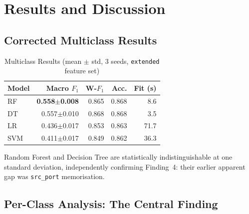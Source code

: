 \documentclass[conference]{IEEEtran}
\newcommand{\col}[1]{\texttt{\small #1}}
\begin{document}
\section{Results and Discussion}
\label{sec:results}

\subsection{Corrected Multiclass Results}

\begin{table}[htbp]
\caption{Multiclass Results (mean $\pm$ std, 3 seeds, \texttt{extended} feature set)}
\centering
\begin{tabular}{lrrrr}
\toprule
\textbf{Model} & \textbf{Macro $F_1$} & \textbf{W-$F_1$} & \textbf{Acc.} & \textbf{Fit (s)} \\
\midrule
RF & \textbf{0.558$\pm$0.008} & 0.865 & 0.868 & 8.6 \\
DT & 0.557$\pm$0.010 & 0.868 & 0.868 & 3.5 \\
LR & 0.436$\pm$0.017 & 0.853 & 0.863 & 71.7 \\
SVM & 0.411$\pm$0.017 & 0.849 & 0.862 & 36.3 \\
\bottomrule
\end{tabular}
\label{tab:results}
\end{table}

Random Forest and Decision Tree are statistically indistinguishable at one standard deviation, independently confirming Finding~4: their earlier apparent gap was \col{src\_port} memorisation.

\subsection{Per-Class Analysis: The Central Finding}
\end{document}
